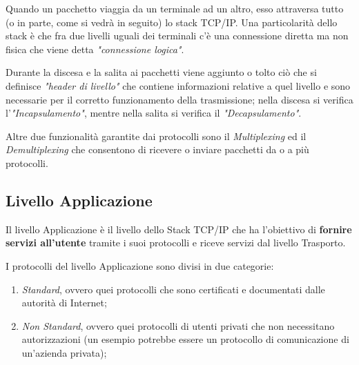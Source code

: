 \documentclass[a4paper]{article}
\begin{document}
	Quando un pacchetto viaggia da un terminale ad un altro, esso attraversa tutto (o in parte, come si vedrà in seguito) lo stack TCP/IP. Una particolarità dello stack è che fra due livelli uguali dei terminali c'è una connessione diretta ma non fisica che viene detta \emph{"connessione logica"}.
	
	Durante la discesa e la salita ai pacchetti viene aggiunto o tolto ciò che si definisce \emph{"header di livello"} che contiene informazioni relative a quel livello e sono necessarie per il corretto funzionamento della trasmissione; nella discesa si verifica l'\emph{"Incapsulamento"}, mentre nella salita si verifica il \emph{"Decapsulamento"}. 
	
	Altre due funzionalità garantite dai protocolli sono il \emph{Multiplexing} ed il \emph{Demultiplexing} che consentono di ricevere o inviare pacchetti da o a più protocolli.
	
	\newpage
	
	\subsection{Livello Applicazione}
	\label{sec:applicazione}
	
		Il livello Applicazione è il livello dello Stack TCP/IP che ha l'obiettivo di \textbf{fornire servizi all'utente} tramite i suoi protocolli e riceve servizi dal livello Trasporto. 
		
		I protocolli del livello Applicazione sono divisi in due categorie:
		\begin{enumerate}
			\item \emph{Standard}, ovvero quei protocolli che sono certificati e documentati dalle autorità di Internet;
			\item \emph{Non Standard}, ovvero quei protocolli di utenti privati che non necessitano autorizzazioni (un esempio potrebbe essere un protocollo di comunicazione di un'azienda privata);
		\end{enumerate}
		
\end{document}

